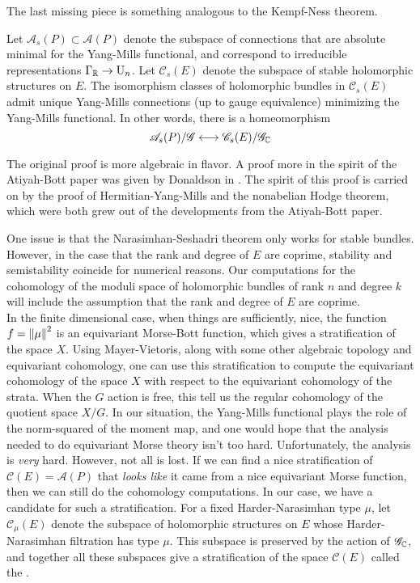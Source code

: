 %
The last missing piece is something analogous to the Kempf-Ness theorem.
%
\begin{thm}
Let $\mathscr{A}_s(P) \subset \mathscr{A}(P)$ denote the subspace of connections
that are absolute minimal for the Yang-Mills functional, and correspond
to irreducible representations $\Gamma_{\mathbb{R}} \to \mathrm{U}_n$. Let $\mathscr{C}_s(E)$
denote the subspace of stable holomorphic structures on $E$. The isomorphism
classes of holomorphic bundles in $\mathscr{C}_s(E)$ admit unique
Yang-Mills connections (up to gauge equivalence) minimizing the Yang-Mills functional.
In other words, there is a homeomorphism
\[
\mathscr{A}_s(P)/\mathscr{G} \longleftrightarrow \mathscr{C}_s(E)/\mathscr{G}_{\mathbb{C}}
\]
\end{thm}
%
\begin{rem*}
The original proof is more algebraic in flavor. A proof more in the spirit
of the Atiyah-Bott paper was given by Donaldson in \cite{donaldson1983}.
The spirit of this proof is carried on by the proof of Hermitian-Yang-Mills
and the nonabelian Hodge theorem, which were both grew out of the
developments from the Atiyah-Bott paper.
\end{rem*}
%
One issue is that the Narasimhan-Seshadri theorem only works for
stable bundles. However, in the case that the rank and degree of $E$
are coprime, stability and semistability coincide for numerical reasons.
Our computations for the cohomology of the moduli space of holomorphic
bundles of rank $n$ and degree $k$ will include the assumption that the
rank and degree of $E$ are coprime. \\
%

In the finite dimensional case, when things are sufficiently, nice,
the function $f = \left\lVert\mu\right\rVert^2$ is an equivariant Morse-Bott function,
which gives a stratification of the space $X$. Using Mayer-Vietoris, along
with some other algebraic topology and equivariant cohomology, one can
use this stratification to compute the equivariant cohomology of
the space $X$ with respect to the equivariant cohomology of the strata.
When the $G$ action is free, this tell us the regular cohomology of
the quotient space $X/G$. In our situation, the Yang-Mills functional
plays the role of the norm-squared of the moment map, and one would hope
that the analysis needed to do equivariant Morse theory isn't too
hard. Unfortunately, the analysis is \emph{very} hard. However, not all is
lost. If we can find a nice stratification of $\mathscr{C}(E) = \mathscr{A}(P)$
that \emph{looks like} it came from a nice equivariant Morse function, then
we can still do the cohomology computations. In our case, we have a
candidate for such a stratification. For a fixed Harder-Narasimhan type
$\mu$, let $\mathscr{C}_\mu(E)$ denote the subspace of holomorphic
structures on $E$ whose Harder-Narasimhan filtration has type $\mu$.
This subspace is preserved by the action of $\mathscr{G}_{\mathbb{C}}$, and
together all these subspaces give a stratification of the space
$\mathscr{C}(E)$ called the .
%